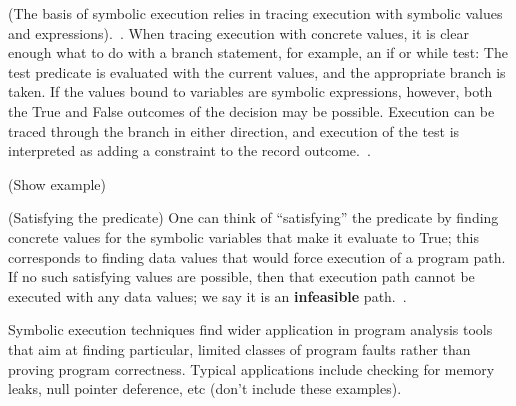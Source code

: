 (The basis of symbolic execution relies in tracing execution with symbolic values and expressions).~\cite{BookPezze2008}. When tracing execution with concrete values, it is clear enough what to do with a branch statement, for example, an if or while test: The test predicate is evaluated with the current values, and the appropriate branch is taken. If the values bound to variables are symbolic expressions, however, both the True and False outcomes of the decision may be possible. Execution can be traced through the branch in either direction, and execution of the test is interpreted as adding a constraint to the record outcome.~\cite{BookPezze2008}. 

(Show example)

(Satisfying the predicate) One can think of ``satisfying'' the predicate by finding concrete values for the symbolic variables that make it evaluate to True; this corresponds to finding data values that would force execution of a program path. If no such satisfying values are possible, then that execution path cannot be executed with any data values; we say it is an \textbf{infeasible} path.~\cite{BookPezze2008}.

Symbolic execution techniques find wider application in program analysis tools that aim at finding particular, limited classes of program faults rather than proving program correctness. Typical applications include checking for memory leaks, null pointer deference, etc (don't include these examples).~\cite{BookPezze2008}




